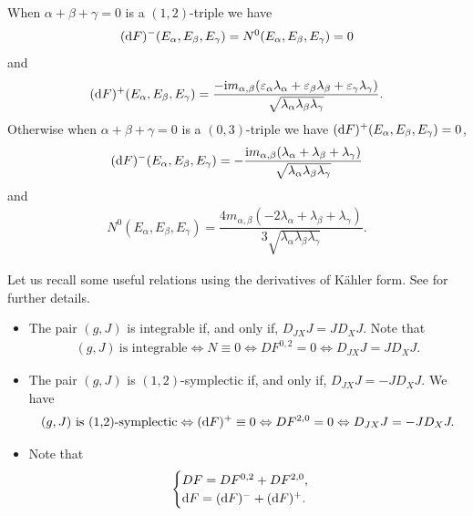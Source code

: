 \documentclass[pdftex]{sigma}%
\numberwithin{equation}{section}
\begin{document}
\begin{Remark}
When $\alpha +\beta+\gamma=0$ is a $(1,2)$-triple we have
\begin{gather*}
({\rm d}F)^{-}(E_{\alpha},E_{\beta},E_{\gamma})=N^{0}(E_{\alpha},E_{\beta},E_{\gamma})=0
\end{gather*}
and
\begin{gather*}
({\rm d}F)^{+}(E_{\alpha},E_{\beta},E_{\gamma})=\dfrac{-{\rm i}m_{\alpha,\beta}(\varepsilon_{\alpha}\lambda_{\alpha}+\varepsilon_{\beta}\lambda_{\beta}+\varepsilon_{\gamma}\lambda_{\gamma})}{\sqrt{\lambda_{\alpha}\lambda_{\beta}\lambda_{\gamma}}}.
\end{gather*}
Otherwise when $\alpha +\beta+\gamma=0$ is a $(0,3)$-triple we have $({\rm d}F)^{+}(E_{\alpha},E_{\beta},E_{\gamma})=0$,
\begin{gather*}
({\rm d}F)^{-}(E_{\alpha},E_{\beta},E_{\gamma})
=-\dfrac{{\rm i}m_{\alpha,\beta}(\lambda_{\alpha}+\lambda_{\beta}+\lambda_{\gamma})}{\sqrt{\lambda_{\alpha}\lambda_{\beta}\lambda_{\gamma}}}
\end{gather*}
and
\begin{gather*}
N^{0}(E_{\alpha},E_{\beta},E_{\gamma})=\dfrac{4m_{\alpha,\beta}(-2\lambda_{\alpha}+\lambda_{\beta}+\lambda_{\gamma})}{3 \sqrt{\lambda_{\alpha}\lambda_{\beta}\lambda_{\gamma}}}.
\end{gather*}
\end{Remark}

\begin{Remark}Let us recall some useful relations using the derivatives of K\"ahler form. See \cite{gau} for further details.
\begin{itemize}\itemsep=0pt
\item The pair $(g,J)$ is integrable if, and only if, $D_{JX}J=JD_{X}J$.
Note that
\begin{gather*}
(g,J) \ \text{is integrable} \Leftrightarrow N\equiv 0 \Leftrightarrow DF^{0,2}=0\Leftrightarrow D_{JX}J=JD_{X}J.
\end{gather*}

\item The pair $(g,J)$ is $(1,2)$-symplectic if, and only if, $D_{JX}J=-JD_{X}J$.
We have
\begin{gather*}
(g,J) \ \text{is} \ \text{(1,2)-symplectic} \Leftrightarrow ({\rm d}F)^{+}\equiv 0 \Leftrightarrow DF^{2,0}=0\Leftrightarrow D_{JX}J=-JD_{X}J.
\end{gather*}

\item Note that
\begin{gather*}
\begin{cases}
DF=DF^{0,2}+DF^{2,0},
\\
{\rm d}F=({\rm d}F)^{-}+({\rm d}F)^{+}.
\end{cases}
\end{gather*}
\end{itemize}
\end{Remark}
\end{document}
